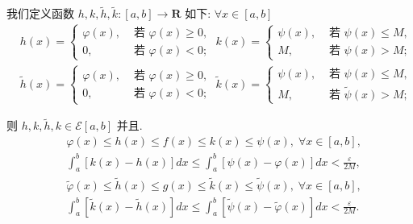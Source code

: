 我们定义函数 $h,k,\widetilde{h},\widetilde{k} : \left\lbrack  {a,b}\right\rbrack   \rightarrow  \mathbf{R}$ 如下: $\forall x \in  \left\lbrack  {a,b}\right\rbrack$
\begin{align*}
	&h\left( x\right)  = \left\{  {\begin{array}{ll} \varphi \left( x\right) , & \text{ 若 }\varphi \left( x\right)  \geq  0, \\  0, & \text{ 若 }\varphi \left( x\right)  < 0; \end{array}\;k\left( x\right)  = \left\{  \begin{array}{ll} \psi \left( x\right) , & \text{ 若 }\psi \left( x\right)  \leq  M, \\  M, & \text{ 若 }\psi \left( x\right)  > M; \end{array}\right. }\right.\\
	&\widetilde{h}\left( x\right)  = \left\{  {\begin{array}{ll} \varphi \left( x\right) , & \text{ 若 }\varphi \left( x\right)  \geq  0, \\  0, & \text{ 若 }\varphi \left( x\right)  < 0; \end{array}\;\widetilde{k}\left( x\right)  = \left\{  \begin{array}{ll} \psi \left( x\right) , & \text{ 若 }\psi \left( x\right)  \leq  M, \\  M, & \text{ 若 }\widetilde{\psi }\left( x\right)  > M; \end{array}\right. }\right.
\end{align*}

则 $h,k,\widetilde{h},k \in  \mathcal{E}\left\lbrack  {a,b}\right\rbrack$ 并且.
\begin{align*}
	&\varphi \left( x\right)  \leq  h\left( x\right)  \leq  f\left( x\right)  \leq  k\left( x\right)  \leq  \psi \left( x\right) ,\;\forall x \in  \left\lbrack  {a,b}\right\rbrack  ,\\
	&{\int }_{a}^{b}\left\lbrack  {k\left( x\right)  - h\left( x\right) }\right\rbrack  {dx} \leq  {\int }_{a}^{b}\left\lbrack  {\psi \left( x\right)  - \varphi \left( x\right) }\right\rbrack  {dx} < \frac{\varepsilon }{2M},\\
	&\widetilde{\varphi }\left( x\right)  \leq  \widetilde{h}\left( x\right)  \leq  g\left( x\right)  \leq  \widetilde{k}\left( x\right)  \leq  \widetilde{\psi }\left( x\right) ,\;\forall x \in  \left\lbrack  {a,b}\right\rbrack  ,\\
	&{\int }_{a}^{b}\left\lbrack  {\widetilde{k}\left( x\right)  - \widetilde{h}\left( x\right) }\right\rbrack  {dx} \leq  {\int }_{a}^{b}\left\lbrack  {\widetilde{\psi }\left( x\right)  - \widetilde{\varphi }\left( x\right) }\right\rbrack  {dx} < \frac{\varepsilon }{2M}.
\end{align*}

